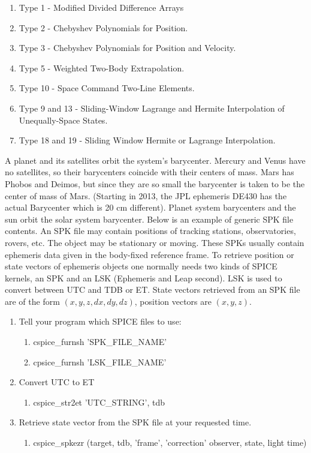 \documentclass[crop=false,class=book]{standalone}
\begin{document}
            \begin{enumerate}
                \item Type 1 - Modified Divided Difference Arrays
                \item Type 2 - Chebyshev Polynomials for Position.
                \item Type 3 - Chebyshev Polynomials for Position and Velocity.
                \item Type 5 - Weighted Two-Body Extrapolation.
                \item Type 10 - Space Command Two-Line Elements.
                \item Type 9 and 13 - Sliding-Window Lagrange and Hermite Interpolation of Unequally-Space States.
                \item Type 18 and 19 - Sliding Window Hermite or Lagrange Interpolation.
            \end{enumerate}
            A planet and its satellites orbit the system's barycenter. Mercury and Venus have no satellites, so their barycenters coincide with their centers of mass. Mars has Phobos and Deimos, but since they are so small the barycenter is taken to be the center of mass of Mars. (Starting in 2013, the JPL ephemeris DE430 has the actual Barycenter which is 20 cm different). Planet system barycenters and the sun orbit the solar system barycenter. Below is an example of generic SPK file contents.
            An SPK file may contain positions of tracking stations, observatories, rovers, etc. The object may be stationary or moving. These SPKs usually contain ephemeris data given in the body-fixed reference frame. To retrieve position or state vectors of ephemeris objects one normally needs two kinds of SPICE kernels, an SPK and an LSK (Ephemeris and Leap second). LSK is used to convert between UTC and TDB or ET. State vectors retrieved from an SPK file are of the form $(x,y,z,dx,dy,dz)$, position vectors are $(x,y,z)$.
            \begin{enumerate}
                \item Tell your program which SPICE files to use:
                \begin{enumerate}
                    \item cspice\_furnsh 'SPK\_FILE\_NAME'
                    \item cpsice\_furnsh 'LSK\_FILE\_NAME'
                \end{enumerate}
                \item Convert UTC to ET
                \begin{enumerate}
                    \item cspice\_str2et 'UTC\_STRING', tdb
                \end{enumerate}
                \item Retrieve state vector from the SPK file at your requested time.
                \begin{enumerate}
                    \item cspice\_spkezr (target, tdb, 'frame', 'correction' observer, state, light time)
                \end{enumerate}
            \end{enumerate}
\end{document}
